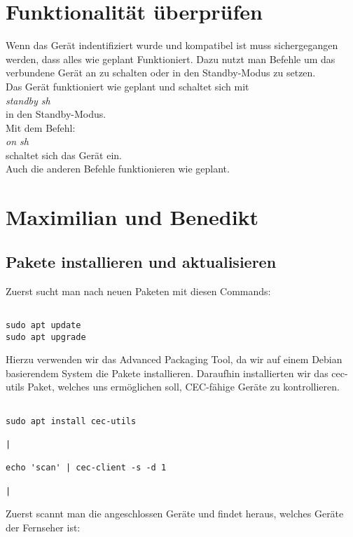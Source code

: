 \documentclass[a4paper]{article}
\begin{document}
\section{Funktionalität überprüfen}
Wenn das Gerät indentifiziert wurde und kompatibel ist muss sichergegangen werden, dass alles wie geplant Funktioniert. Dazu nutzt man Befehle um das verbundene Gerät an zu schalten oder in den Standby-Modus zu setzen. \\
Das Gerät funktioniert wie geplant und schaltet sich mit \\
\textsl{standby sh}\\
in den Standby-Modus.\\
Mit dem Befehl:\\
\textsl{on sh}\\
schaltet sich das Gerät ein.\\
Auch die anderen Befehle funktionieren wie geplant.
\clearpage

\section{Maximilian und Benedikt}

\subsection{Pakete installieren und aktualisieren}
Zuerst sucht man nach neuen Paketen mit diesen Commands:
\begin{lstlisting}

sudo apt update
sudo apt upgrade

\end{lstlisting}

\noindent
Hierzu verwenden wir das Advanced Packaging Tool, da wir auf einem Debian basierendem System die Pakete installieren.
\break
\break
Daraufhin installierten wir das cec-utils Paket, welches uns ermöglichen soll, CEC-fähige Geräte zu kontrollieren. 
\begin{lstlisting}

sudo apt install cec-utils

|

echo 'scan' | cec-client -s -d 1

|

\end{lstlisting}
\noindent

Zuerst scannt man die angeschlossen Geräte und findet heraus, welches Geräte der Fernseher ist:
\end{document}
